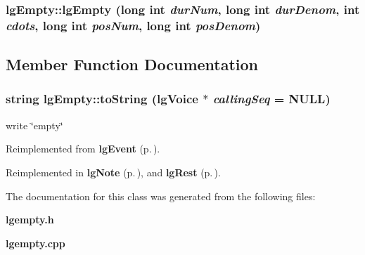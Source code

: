 \subsubsection{\setlength{\rightskip}{0pt plus 5cm}lg\-Empty::lg\-Empty (long int {\em dur\-Num}, long int {\em dur\-Denom}, int {\em cdots}, long int {\em pos\-Num}, long int {\em pos\-Denom})}\label{classlgEmpty_a1}




\subsection{Member Function Documentation}
\subsubsection{\setlength{\rightskip}{0pt plus 5cm}string lg\-Empty::to\-String ({\bf lg\-Voice} $\ast$ {\em calling\-Seq} = NULL)\hspace{0.3cm}{\tt  [virtual]}}\label{classlgEmpty_a0}


write \char`\"{}empty\char`\"{} 



Reimplemented from {\bf lg\-Event} {\rm (p.\,\pageref{classlgEvent_a1})}.

Reimplemented in {\bf lg\-Note} {\rm (p.\,\pageref{classlgNote_a0})}, and {\bf lg\-Rest} {\rm (p.\,\pageref{classlgRest_a0})}.

The documentation for this class was generated from the following files:\begin{CompactItemize}
\item 
{\bf lgempty.h}\item 
{\bf lgempty.cpp}\end{CompactItemize}
